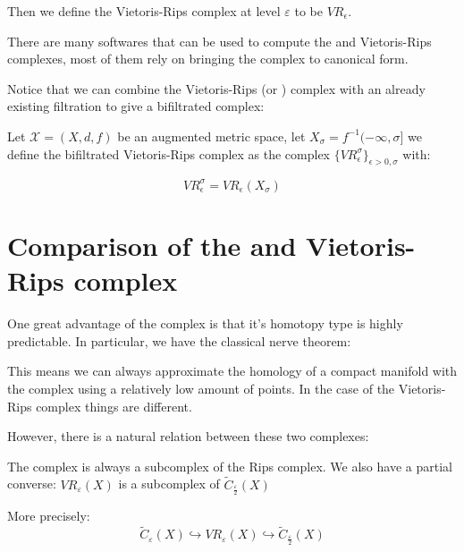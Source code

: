 Then we define the Vietoris-Rips complex at level $\varepsilon$ to be 
$VR_\epsilon$.



%

There are many softwares that can be used to compute the
{\Cech} and Vietoris-Rips complexes, most of them rely on bringing the complex to canonical form.


Notice that we can combine the Vietoris-Rips (or {\Cech}) complex 
with an already existing filtration to give a bifiltrated complex:

\begin{definition}

Let $\mathcal{X}=(X,d,f)$ be an augmented metric space,
let $X_\sigma=f^{-1}(-\infty,\sigma]$ we define the bifiltrated
Vietoris-Rips complex as the complex
$\{{VR}_\epsilon^\sigma\}_{\epsilon>0,\sigma}$
with:

$$
{VR}_\epsilon^\sigma=
{VR}_\epsilon(X_\sigma)
$$

\end{definition}

\section{Comparison of the {\Cech} and Vietoris-Rips complex}

One great advantage of the {\Cech} complex is that it's homotopy type is highly predictable.
In particular, we have the classical {\Cech} nerve theorem:

This means we can always approximate the homology of a compact
manifold with the {\Cech} complex using a relatively low amount of points.
In the case of the Vietoris-Rips complex things are different.


However, there is a natural relation between these two complexes:

\begin{proposition}
The {\Cech} complex is always a subcomplex of the Rips complex. 
We also have a partial converse:
$VR_\varepsilon(X)$ is a subcomplex of $\tilde C_\frac{\varepsilon}{2}(X)$

More precisely:
$$
\tilde C_\varepsilon(X)
\hookrightarrow
VR_\varepsilon(X)
\hookrightarrow
\tilde C_\frac{\varepsilon}{2}(X)
$$
\end{proposition}


